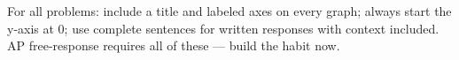 \documentclass[10pt]{article}
\begin{document}
\namedateperiod

\vspace{0.1in}

\begin{tcolorbox}[colback=sky, colframe=navy, boxrule=0.8pt, arc=2mm,
    left=3mm, right=3mm, top=1.5mm, bottom=1.5mm]
\small For all problems: include a title and labeled axes on every graph; always
start the y-axis at 0; use complete sentences for written responses with context
included. AP free-response requires all of these --- build the habit now.
\end{tcolorbox}

\vspace{0.14in}

\end{document}
